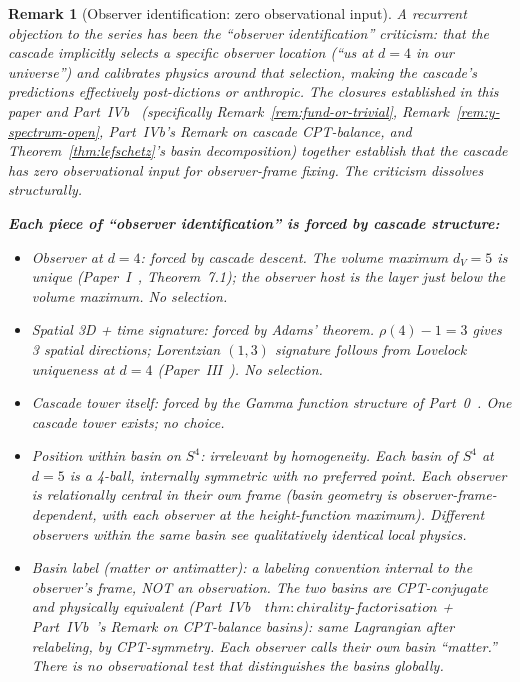 \documentclass[12pt,a4paper]{article}
\newtheorem{remark}[theorem]{Remark}
\begin{document}
\begin{remark}[Observer identification: zero observational input]\label{rem:observer-identification}
A recurrent objection to the series has been the ``observer
identification'' criticism: that the cascade implicitly selects a
specific observer location (``us at $d=4$ in our universe'') and
calibrates physics around that selection, making the cascade's
predictions effectively post-dictions or anthropic. The closures
established in this paper and Part~IVb~\cite{part4b}
(specifically Remark~\ref{rem:fund-or-trivial},
Remark~\ref{rem:y-spectrum-open}, Part~IVb's Remark on cascade
CPT-balance, and Theorem~\ref{thm:lefschetz}'s basin decomposition)
together establish that the cascade has \emph{zero observational
input for observer-frame fixing}. The criticism dissolves
structurally.

\medskip\noindent\textbf{Each piece of ``observer identification''
is forced by cascade structure:}
\begin{itemize}
\item \emph{Observer at $d=4$}: forced by cascade descent. The
volume maximum $d_V=5$ is unique (Paper~I~\cite{part0},
Theorem~7.1); the observer host is the layer just below the volume
maximum. No selection.
\item \emph{Spatial 3D + time signature}: forced by Adams' theorem.
$\rho(4)-1=3$ gives 3 spatial directions; Lorentzian $(1,3)$
signature follows from Lovelock uniqueness at $d=4$
(Paper~III~\cite{part3}). No selection.
\item \emph{Cascade tower itself}: forced by the Gamma function
structure of Part~0~\cite{part0}. One cascade tower exists; no
choice.
\item \emph{Position within basin on $S^4$}: irrelevant by
homogeneity. Each basin of $S^4$ at $d=5$ is a 4-ball, internally
symmetric with no preferred point. Each observer is
\emph{relationally central} in their own frame (basin geometry is
observer-frame-dependent, with each observer at the height-function
maximum). Different observers within the same basin see
qualitatively identical local physics.
\item \emph{Basin label} (matter or antimatter): a labeling
convention internal to the observer's frame, NOT an observation.
The two basins are CPT-conjugate and physically equivalent
(Part~IVb~\cite{part4b}~$\mathit{thm{:}chirality\text{-}factorisation}$ + Part~IVb~\cite{part4b}'s
Remark on CPT-balance basins): same Lagrangian after relabeling, by
CPT-symmetry. Each observer calls their own basin ``matter.'' There
is no observational test that distinguishes the basins globally.
\end{itemize}


\end{remark}
\end{document}
